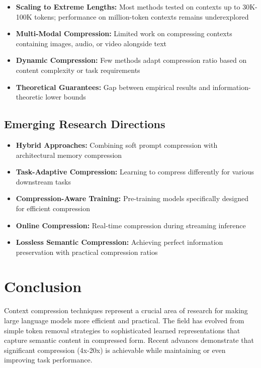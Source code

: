 \documentclass[11pt]{article}
\begin{document}
\begin{itemize}[leftmargin=*]
    \item \textbf{Scaling to Extreme Lengths:} Most methods tested on contexts up to 30K-100K tokens; performance on million-token contexts remains underexplored
    \item \textbf{Multi-Modal Compression:} Limited work on compressing contexts containing images, audio, or video alongside text
    \item \textbf{Dynamic Compression:} Few methods adapt compression ratio based on content complexity or task requirements
    \item \textbf{Theoretical Guarantees:} Gap between empirical results and information-theoretic lower bounds
\end{itemize}

\subsection{Emerging Research Directions}

\begin{itemize}[leftmargin=*]
    \item \textbf{Hybrid Approaches:} Combining soft prompt compression with architectural memory compression
    \item \textbf{Task-Adaptive Compression:} Learning to compress differently for various downstream tasks
    \item \textbf{Compression-Aware Training:} Pre-training models specifically designed for efficient compression
    \item \textbf{Online Compression:} Real-time compression during streaming inference
    \item \textbf{Lossless Semantic Compression:} Achieving perfect information preservation with practical compression ratios
\end{itemize}

\section{Conclusion}

Context compression techniques represent a crucial area of research for making large language models more efficient and practical. The field has evolved from simple token removal strategies to sophisticated learned representations that capture semantic content in compressed form. Recent advances demonstrate that significant compression (4x-20x) is achievable while maintaining or even improving task performance.
\end{document}
